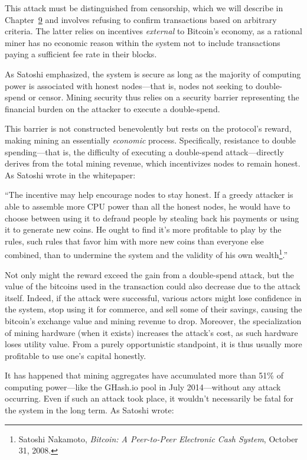 \documentclass[
  a5paper,
  smalldemyvopaper,10pt,twoside,onecolumn,openright,extrafontsizes,hidelinks]{memoir}
\newlength\drop
\begin{document}
This attack must be distinguished from censorship, which we will
describe in Chapter~\hyperref[ch:censure]{9} and involves refusing to
confirm transactions based on arbitrary criteria. The latter relies on
incentives \emph{external} to Bitcoin's economy, as a rational miner has
no economic reason within the system not to include transactions paying
a sufficient fee rate in their blocks.

As Satoshi emphasized, the system is secure as long as the majority of
computing power is associated with honest nodes---that is, nodes not
seeking to double-spend or censor. Mining security thus relies on a
security barrier representing the financial burden on the attacker to
execute a double-spend.

This barrier is not constructed benevolently but rests on the protocol's
reward, making mining an essentially \emph{economic} process.
Specifically, resistance to double spending---that is, the difficulty of
executing a double-spend attack---directly derives from the total mining
revenue, which incentivizes nodes to remain honest. As Satoshi wrote in
the whitepaper:

``The incentive may help encourage nodes to stay honest. If a greedy
attacker is able to assemble more CPU power than all the honest nodes,
he would have to choose between using it to defraud people by stealing
back his payments or using it to generate new coins. He ought to find
it's more profitable to play by the rules, such rules that favor him
with more new coins than everyone else combined, than to undermine the
system and the validity of his own wealth\footnote{Satoshi Nakamoto,
  \emph{Bitcoin: A Peer-to-Peer Electronic Cash System}, October 31,
  2008.}.''

Not only might the reward exceed the gain from a double-spend attack,
but the value of the bitcoins used in the transaction could also
decrease due to the attack itself. Indeed, if the attack were
successful, various actors might lose confidence in the system, stop
using it for commerce, and sell some of their savings, causing the
bitcoin's exchange value and mining revenue to drop. Moreover, the
specialization of mining hardware (when it exists) increases the
attack's cost, as such hardware loses utility value. From a purely
opportunistic standpoint, it is thus usually more profitable to use
one's capital honestly.

It has happened that mining aggregates have accumulated more than 51\%
of computing power---like the GHash.io pool in July 2014---without any
attack occurring. Even if such an attack took place, it wouldn't
necessarily be fatal for the system in the long term. As Satoshi wrote:
\end{document}
